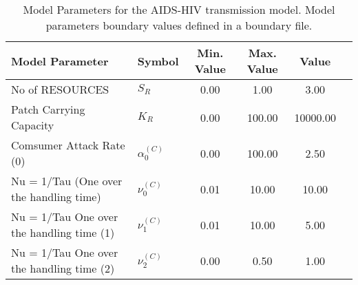\begin{table}
\centering
\begin{tabular}{p{5cm}lcccc}
{\bf Model Parameter} & {\bf Symbol} & {\bf Min. Value} & {\bf Max. Value} & {\bf Value}\\
\hline\hline
No of RESOURCES & $S_R$ & 0.00 & 1.00 & 3.00\\
Patch Carrying Capacity & $K_R$ & 0.00 & 100.00 & 10000.00\\
Comsumer Attack Rate (0) & $\alpha^{(C)}_0$ & 0.00 & 100.00 & 2.50\\
Nu = 1/Tau (One over the handling time) & $\nu^{(C)}_0$ & 0.01 & 10.00 & 10.00\\
 Nu = 1/Tau	 One over the handling time (1) & $\nu^{(C)}_1$ & 0.01 & 10.00 & 5.00\\
 Nu = 1/Tau	 One over the handling time (2) & $\nu^{(C)}_2$ & 0.00 & 0.50 & 1.00\\
\hline\hline
\end{tabular}
\caption{Model Parameters for the AIDS-HIV transmission model. Model parameters boundary values defined in a boundary file.}
\end{table}
